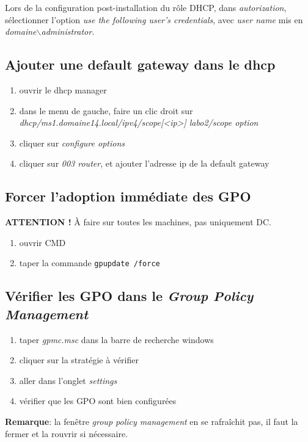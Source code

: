 \documentclass[a4paper]{article}
\begin{document}
Lors de la configuration post-installation du rôle DHCP, dans \textit{autorization}, sélectionner l'option \textit{use the following user's credentials}, avec \textit{user name} mis en \textit{domaine$\backslash$administrator}.





\subsection{Ajouter une default gateway dans le dhcp}



\begin{enumerate}
    \item ouvrir le dhcp manager
    \item dans le menu de gauche, faire un clic droit sur \textit{dhcp/ms1.domaine14.local/ipv4/scope[<ip>] labo2/scope option}
    \item cliquer sur \textit{configure options}
    \item cliquer sur \textit{003 router}, et ajouter l'adresse ip de la default gateway
\end{enumerate}





\subsection{Forcer l'adoption immédiate des GPO}



\textbf{ATTENTION !} À faire sur toutes les machines, pas uniquement DC.
\begin{enumerate}
    \item ouvrir CMD
    \item taper la commande \texttt{gpupdate /force}
\end{enumerate}





\subsection{Vérifier les GPO dans le \textit{Group Policy Management}}



\begin{enumerate}
    \item taper \textit{gpmc.msc} dans la barre de recherche windows
    \item cliquer sur la stratégie à vérifier
    \item aller dans l'onglet \textit{settings}
    \item vérifier que les GPO sont bien configurées
\end{enumerate}
\textbf{Remarque}: la fenêtre \textit{group policy management} en se rafraîchit pas, il faut la fermer et la rouvrir si nécessaire.
\end{document}
